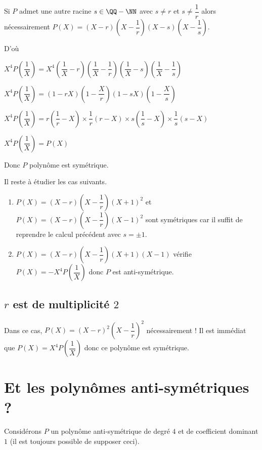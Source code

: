\documentclass[12pt]{amsart}
\begin{document}
Si $P$ admet une autre racine $s \in \QQ - \NN$ avec $s \neq r$ et $s \neq \dfrac1r$ alors nécessairement $P(X) = (X - r) \left( X - \dfrac1r \right) (X - s) \left( X - \dfrac1s \right)$.


D'où

$X^4 P\left( \dfrac1X \right)
= X^4 
  \left( \dfrac1X - r \right) \left( \dfrac1X - \dfrac1r \right) 
  \left( \dfrac1X - s \right) \left( \dfrac1X - \dfrac1s \right)$

$X^4 P\left( \dfrac1X \right)
= ( 1 - r X) \left( 1 - \dfrac{X}{r} \right) 
  ( 1 - s X) \left( 1 - \dfrac{X}{s} \right)$

$X^4 P\left( \dfrac1X \right)
= r \left( \dfrac1r - X \right) \times \dfrac1r ( r - X) 
  \times s \left( \dfrac1s - X \right) \times \dfrac1s ( s - X)$

$X^4 P\left( \dfrac1X \right)
= P(X)$

\medskip

Donc $P$ polynôme est symétrique.


\bigskip

Il reste à étudier les cas suivants.

\begin{enumerate}
	\item $P(X) = (X - r) \left( X - \dfrac1r \right) (X + 1)^2$ et $P(X) = (X - r) \left( X - \dfrac1r \right) (X - 1)^2$ sont symétriques car il suffit de reprendre le calcul précédent avec $s = \pm 1$.
	

	\item $P(X) = (X - r) \left( X - \dfrac1r \right) (X + 1) (X - 1)$ vérifie $P(X) = - X^4 P\left( \dfrac1X \right)$ donc $P$ est anti-symétrique.
\end{enumerate}


\subsection*{$r$ est de multiplicité $2$}

Dans ce cas, $P(X) = (X - r)^2 \left( X - \dfrac1r \right)^2$ nécessairement !
Il est immédiat que $P(X) = X^4 P\left( \dfrac1X \right)$ donc ce polynôme est symétrique.



\section{Et les polynômes anti-symétriques ?}

Considérons $P$ un polynôme anti-symétrique de degré $4$ et de coefficient dominant $1$ (il est toujours possible de supposer ceci).
\end{document}
